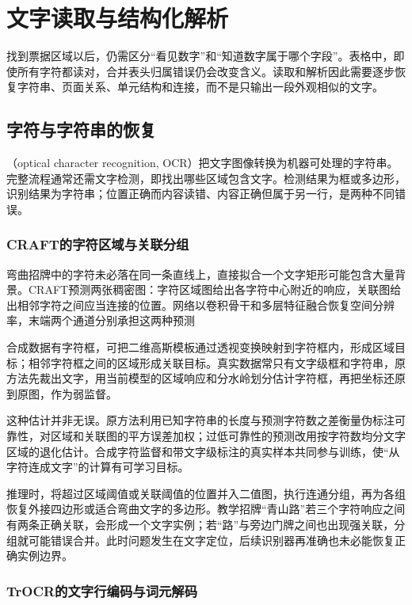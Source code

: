 \section{文字读取与结构化解析}
\label{sec:vision-understanding-reading}

找到票据区域以后，仍需区分“看见数字”和“知道数字属于哪个字段”。表格中，即使所有字符都读对，合并表头归属错误仍会改变含义。读取和解析因此需要逐步恢复字符串、页面关系、单元结构和连接，而不是只输出一段外观相似的文字。

\subsection{字符与字符串的恢复}
\label{sec:vision-understanding-ocr}

（optical character recognition, OCR）把文字图像转换为机器可处理的字符串。完整流程通常还需文字检测，即找出哪些区域包含文字。检测结果为框或多边形，识别结果为字符串；位置正确而内容读错、内容正确但属于另一行，是两种不同错误。

\subsubsection{CRAFT的字符区域与关联分组}
\label{sec:vision-understanding-craft}

弯曲招牌中的字符未必落在同一条直线上，直接拟合一个文字矩形可能包含大量背景。CRAFT预测两张稠密图：字符区域图给出各字符中心附近的响应，关联图给出相邻字符之间应当连接的位置。网络以卷积骨干和多层特征融合恢复空间分辨率，末端两个通道分别承担这两种预测

合成数据有字符框，可把二维高斯模板通过透视变换映射到字符框内，形成区域目标；相邻字符框之间的区域形成关联目标。真实数据常只有文字级框和字符串，原方法先裁出文字，用当前模型的区域响应和分水岭划分估计字符框，再把坐标还原到原图，作为弱监督。

这种估计并非无误。原方法利用已知字符串的长度与预测字符数之差衡量伪标注可靠性，对区域和关联图的平方误差加权；过低可靠性的预测改用按字符数均分文字区域的退化估计。合成字符监督和带文字级标注的真实样本共同参与训练，使“从字符连成文字”的计算有可学习目标。

推理时，将超过区域阈值或关联阈值的位置并入二值图，执行连通分组，再为各组恢复外接四边形或适合弯曲文字的多边形。教学招牌“青山路”若三个字符响应之间有两条正确关联，会形成一个文字实例；若“路”与旁边门牌之间也出现强关联，分组就可能错误合并。此时问题发生在文字定位，后续识别器再准确也未必能恢复正确实例边界。

\subsubsection{TrOCR的文字行编码与词元解码}
\label{sec:vision-understanding-trocr}

